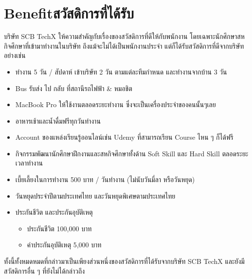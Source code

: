 \section{\ifenglish Benefit\else สวัสดิการที่ได้รับ\fi}
บริษัท SCB TechX ให้ความสำคัญกับเรื่องของสวัสดิการที่ดีให้กับพนักงาน โดยเฉพาะนักศึกษาสหกิจศึกษาที่เข้ามาทำงานในบริษัท
ถึงแม้จะไม่ได้เป็นพนักงานประจำ แต่ก็ได้รับสวัสดิการที่ดีจากบริษัทอย่างเช่น
\begin{itemize}
      \item ทำงาน 5 วัน / สัปดาห์ เข้าบริษัท 2 วัน ตามแต่ละทีมกำหนด และทำงานจากบ้าน 3 วัน
      \item Bus รับส่ง ไป กลับ ที่สถานีรถไฟฟ้า \& หมอชิต
      \item MacBook Pro ให้ใช้งานตลอดระยะทำงาน ซึ่งจะเป็นเครื่องประจำของคนนั้นๆเลย
      \item อาหารเช้าและน้ำดื่มฟรีทุกวันทำงาน
      \item Account ของแหล่งเรียนรู้ออนไลน์เช่น Udemy ที่สามารถเรียน Course ไหน ๆ ก็ได้ฟรี
      \item กิจกรรมพัฒนานักศึกษาฝึกงานและสหกิจศึกษาทั้งด้าน Soft Skill และ Hard Skill ตลอดระยะเวลาทำงาน
      \item เบี้ยเลี้ยงในการทำงาน 500 บาท / วันทำงาน (ไม่นับวันมี่ลา หรือวันหยุด)
      \item วันหยุดประจำปีตามประเทศไทย และวันหยุดพิเศษตามประเทศไทย
      \item ประกันชีวิต และประกันอุบัติเหตุ
            \begin{itemize}
                  \item ประกันชีวิต 100,000 บาท
                  \item ค่าประกันอุบัติเหตุ 5,000 บาท
            \end{itemize}
\end{itemize}
ทั้งนี้ทั้งหมดหมดที่กล่าวมาเป็นเพียงส่วนหนึ่งของสวัสดิการที่ได้รับจากบริษัท SCB TechX และยังมีสวัสดิการอื่น ๆ ที่ยังไม่ได้กล่าวถึง

\clearpage


